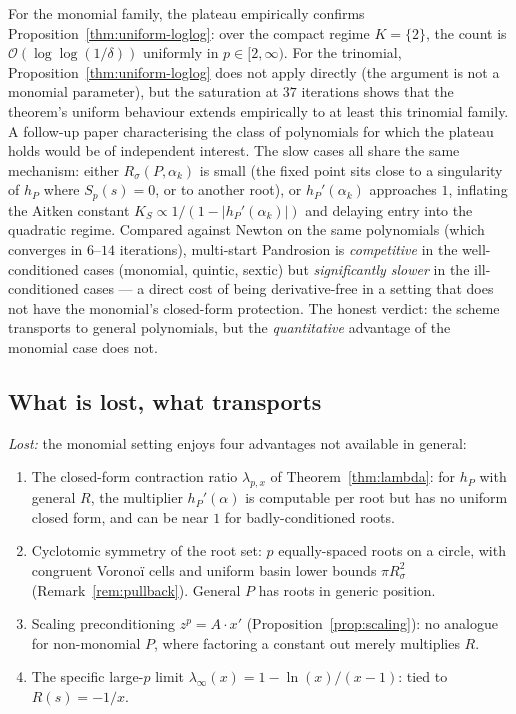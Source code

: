 \documentclass[11pt,a4paper]{article}
\theoremstyle{definition}
\begin{document}
For the monomial family, the plateau empirically confirms Proposition~\ref{thm:uniform-loglog}: over the compact regime $K = \{2\}$, the count is $\mathcal{O}(\log\log(1/\delta))$ uniformly in $p \in [2, \infty)$. For the trinomial, Proposition~\ref{thm:uniform-loglog} does not apply directly (the argument is not a monomial parameter), but the saturation at $37$ iterations shows that the theorem's uniform behaviour extends empirically to at least this trinomial family. A follow-up paper characterising the class of polynomials for which the plateau holds would be of independent interest. The slow cases all share the same mechanism: either $R_\sigma(P, \alpha_k)$ is small (the fixed point sits close to a singularity of $h_P$ where $S_p(s) = 0$, or to another root), or $h_P'(\alpha_k)$ approaches $1$, inflating the Aitken constant $K_S \propto 1/(1 - |h_P'(\alpha_k)|)$ and delaying entry into the quadratic regime. Compared against Newton on the same polynomials (which converges in $6$--$14$ iterations), multi-start Pandrosion is \emph{competitive} in the well-conditioned cases (monomial, quintic, sextic) but \emph{significantly slower} in the ill-conditioned cases --- a direct cost of being derivative-free in a setting that does not have the monomial's closed-form protection. The honest verdict: the scheme transports to general polynomials, but the \emph{quantitative} advantage of the monomial case does not.

\subsection{What is lost, what transports}

\emph{Lost:} the monomial setting enjoys four advantages not available in general:
\begin{enumerate}
  \item The closed-form contraction ratio $\lambda_{p,x}$ of Theorem~\ref{thm:lambda}: for $h_P$ with general $R$, the multiplier $h_P'(\alpha)$ is computable per root but has no uniform closed form, and can be near $1$ for badly-conditioned roots.
  \item Cyclotomic symmetry of the root set: $p$ equally-spaced roots on a circle, with congruent Voronoï cells and uniform basin lower bounds $\pi R_\sigma^2$ (Remark~\ref{rem:pullback}). General $P$ has roots in generic position.
  \item Scaling preconditioning $z^p = A \cdot x'$ (Proposition~\ref{prop:scaling}): no analogue for non-monomial $P$, where factoring a constant out merely multiplies $R$.
  \item The specific large-$p$ limit $\lambda_\infty(x) = 1 - \ln(x)/(x-1)$: tied to $R(s) = -1/x$.
\end{enumerate}
\end{document}
